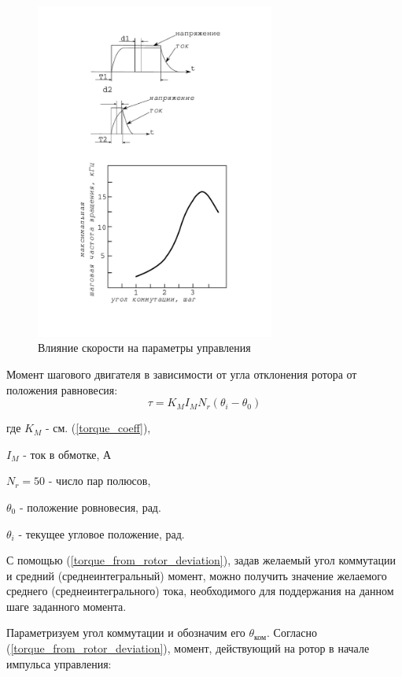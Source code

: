 \begin{figure}
    \centering
    \includegraphics[width=0.7\textwidth, keepaspectratio]{./src/pictures/max_step_motor_by_com_angle}
    \caption{Влияние скорости на параметры управления}
    \label{graph_speed_and_angle_comutation}
\end{figure}

Момент шагового двигателя в зависимости от угла отклонения ротора от положения равновесия:
\begin{equation}
    \label{torque_from_rotor_deviation}
    \tau = K_{M} I_{M} N_{r} ( \theta_{i} - \theta_{0} )
\end{equation}

где $K_{M}$ - см. (\ref{torque_coeff}),

$I_{M}$ - ток в обмотке, А

$N_{r} = 50$ - число пар полюсов,

$\theta_{0}$ - положение ровновесия, рад.

$\theta_{i}$ - текущее угловое положение, рад.

С помощью (\ref{torque_from_rotor_deviation}), задав желаемый угол коммутации и
средний (среднеинтегральный) момент, можно получить значение желаемого среднего
(среднеинтегрального) тока, необходимого для поддержания на данном шаге заданного момента.

Параметризуем угол коммутации и обозначим его $\theta_{\textit{ком}}$.
Согласно (\ref{torque_from_rotor_deviation}), момент, действующий на ротор
в начале импульса управления:

